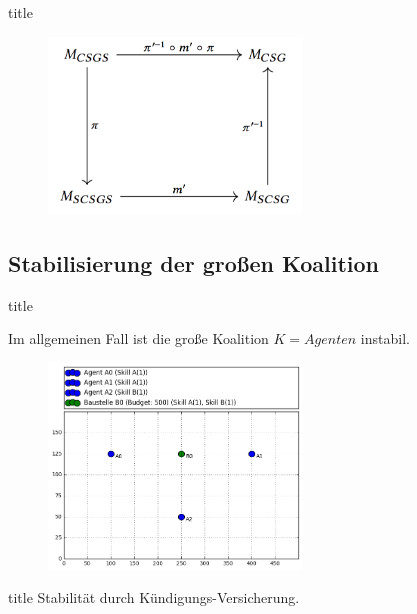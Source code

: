 \documentclass[c]{beamer}
\theoremstyle{break}
\begin{document}
  \begin{frame}{title}
    \begin{figure}
      \centering
      \includegraphics[width=0.6\textwidth]{bez.png}
    \end{figure}
  \end{frame}



  \subsection*{Stabilisierung der großen Koalition}
  \begin{frame}{title} %
    \begin{lemma}[Instabilität]
      Im allgemeinen Fall ist die große Koalition $K=Agenten$ instabil.
    \end{lemma}

      \begin{figure}
        \centering
        \includegraphics[width=0.6\textwidth]{example-exchangeable-agents.png}
        \label{szenario1}
      \end{figure}

  \end{frame}
  \begin{frame}{title} %
    Stabilität durch Kündigungs-Versicherung.
  \end{frame}
\end{document}
